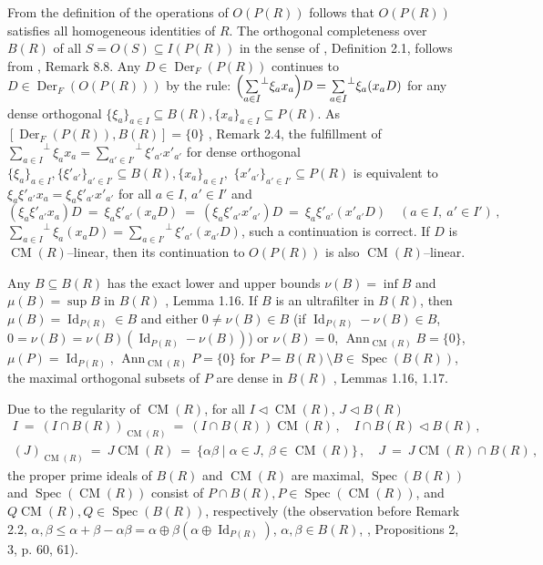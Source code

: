 \documentclass[a4paper,11pt]{article}
\DeclareMathOperator{\Spec}{Spec}
\DeclareMathOperator{\Id}{Id}
\DeclareMathOperator{\Der}{Der}
\DeclareMathOperator{\CM}{CM}
\DeclareMathOperator{\Ann}{Ann}
\begin{document}
From the definition of the operations of $O(P(R))$ follows that $O(P(R))$ 
satisfies all homogeneous identities of $R$.
The orthogonal completeness over $B(R)$ of all ${S=O(S)\subseteq I(P(R))}$ in the 
sense of \cite{BMich}, Definition 2.1, follows from \cite{BMich}, Remark 8.8. 
Any ${D\in \Der_F(P(R))}$ continues to ${D\in \Der_F(O(P(R)))}$ by the rule: 
${\Bigl({\sum\limits_{a\in I}}^{\perp} \xi_a x_a\Bigr) D=
{\sum\limits_{a\in I}}^{\perp} \xi_a (x_a D)}$
for any dense orthogonal ${\{\xi_a\}_{a\in I}\subseteq B(R), 
\{x_a\}_{a\in I}\subseteq P(R)}$. As 
${[\Der_F(P(R)), B(R)]=\{0\}}$ \cite{Gol10}, Remark 2.4, the fulfillment 
of ${{\sum\limits_{a\in I}}^{\perp} \xi_a x_a={\sum\limits_{a'\in I'}}^{\perp} 
\xi'_{a'} x'_{a'}}$ for dense orthogonal 
${\{\xi_a\}_{a\in I}, \{\xi'_{a'}\}_{a'\in I'}\subseteq B(R), 
\{x_a\}_{a\in I},}$ ${\{x'_{a'}\}_{a'\in I'}\subseteq P(R)}$ is equivalent to 
${\xi_a \xi'_{a'} x_a=\xi_a \xi'_{a'} x'_{a'}}$ for all ${a\in I}$, 
${a'\in I'}$ and 
\[
(\xi_a \xi'_{a'} x_a) D\ =\ \xi_a \xi'_{a'} (x_a D)\ =\ 
(\xi_a \xi'_{a'} x'_{a'}) D\ =\ \xi_a \xi'_{a'} (x'_{a'} D)\quad 
(a\in I,\ a'\in I')\,,
\] 
${{\sum\limits_{a\in I}}^{\perp} \xi_a (x_a D)=
{\sum\limits_{a\in I'}}^{\perp} \xi'_{a'} (x_{a'} D)}$, such a continuation 
is correct. If $D$ is $\CM(R)$--linear, then its continuation to $O(P(R))$ 
is also $\CM(R)$--linear. 

Any ${B\subseteq B(R)}$ has the exact lower and upper bounds ${\nu(B)=\inf B}$ 
and ${\mu(B)=\sup B}$ in $B(R)$ \cite{BMich}, Lemma 1.16. 
If $B$ is an ultrafilter in $B(R)$, then ${\mu(B)=\Id_{P(R)}\in B}$ and\linebreak 
either ${0\ne \nu(B)\in B}$ (if ${\Id_{P(R)}-\nu(B)\in B}$,  
${0=\nu(B)=\nu(B) (\Id_{P(R)}-\nu(B))}$) or ${\nu(B)=0}$, 
${\Ann_{\CM(R)} B=\{0\}}$, ${\mu(P)=\Id_{P(R)}}$, 
${\Ann_{\CM(R)} P=\{0\}}$ for ${P=B(R)\setminus B\in \Spec(B(R))}$, the maximal 
orthogonal subsets of $P$ are dense in $B(R)$ 
\cite{BMich}, Lemmas 1.16, 1.17.

Due to the regularity of $\CM(R)$, for all ${I\lhd \CM(R)}$, ${J\lhd B(R)}$ 
\begin{gather*}
I\ =\ (I\cap B(R))_{\CM(R)}\ =\ (I\cap B(R)) \CM(R)\,,\quad 
I\cap B(R)\lhd B(R)\,,
\\
(J)_{\CM(R)}\ =\ J \CM(R)\ =\ 
\{\alpha \beta\mid \alpha\in J,\ \beta\in \CM(R)\}\,,\quad 
J\ =\ J \CM(R)\cap B(R)\,,
\end{gather*}
the proper prime ideals of $B(R)$ and $\CM(R)$ are maximal, 
$\Spec(B(R))$ and $\Spec(\CM(R))$ consist of  
${P\cap B(R), P\in \Spec(\CM(R))}$, and ${Q \CM(R), Q\in \Spec(B(R))}$,  
respectively (the observation before Remark 2.2, 
${\alpha, \beta\leq \alpha+\beta-\alpha \beta=
\alpha\oplus \beta (\alpha\oplus \Id_{P(R)})}$, ${\alpha, \beta\in B(R)}$, 
\cite{Lamb}, Propositions 2, 3, p. 60, 61).
\end{document}
